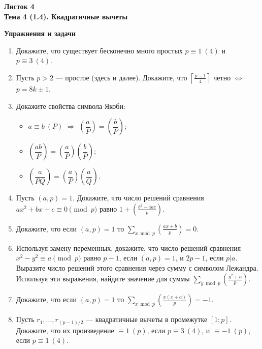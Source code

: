\documentclass[a4paper, 11pt]{article}
\begin{document}

\begin{center} \Large \bf Листок 4\\ Тема 4 (1.4). Квадратичные вычеты \end{center}

\noindent\textbf{Упражнения и задачи}

\begin{enumerate}[topsep=0pt]
    \item Докажите, что существует бесконечно много простых $p\equiv 1\ (4)$ и $p\equiv 3\ (4)$.
    \item Пусть $p>2$ --- простое (здесь и далее). Докажите, что $\left \lceil \frac{p-1}{4} \right \rceil $  четно $\Leftrightarrow$ $p=8k \pm 1$.
    \item Докажите свойства символа Якоби:
    \begin{itemize}[noitemsep,topsep=0pt]
        \item $a\equiv b\ (P)$ $\Rightarrow$ $\left(\dfrac{a}{P}\right)=\left(\dfrac{b}{P}\right)$;
        \item $\left(\dfrac{ab}{P}\right)=\left(\dfrac{a}{P}\right)\left(\dfrac{b}{P}\right)$;
        \item $\left(\dfrac{a}{PQ}\right)=\left(\dfrac{a}{P}\right)\left(\dfrac{a}{Q}\right)$.
    \end{itemize}
    
    \item Пусть $(a,p)=1$. Докажите, что число решений сравнения\\ $ax^2+bx+c \equiv 0 \pmod{p}$ равно $1+\left(\frac{b^2-4ac}{p}\right)$. %
    \item Докажите, что если $(a,p)=1$ то $\sum_{x \bmod p} \left(\frac{ax+b}{p}\right)=0$. %
    \item Используя замену переменных, докажите, что число решений сравнения $x^2-y^2 \equiv a \pmod{p}$ равно $p-1$, если $(a,p)=1$, и $2p-1$, если $p|a$. Выразите число решений этого сравнения через сумму с символом Лежандра. Используя эти выражения, найдите значение для суммы $\sum_{y \bmod p} \left(\frac{y^2+a}{p}\right)$. %
    \item Докажите, что если $(a,p)=1$ то $\sum_{x \bmod p} \left(\frac{x(x+a)}{p}\right)=-1$. %
    \item Пусть $r_1, \dots, r_{(p-1)/2}$ --- квадратичные вычеты в промежутке $[1;p]$. Докажите, что их произведение $\equiv 1\ (p)$, если $p \equiv 3\ (4)$, и  $\equiv -1\ (p)$, если $p \equiv 1\ (4)$. %
    

\end{enumerate}
\end{document}
